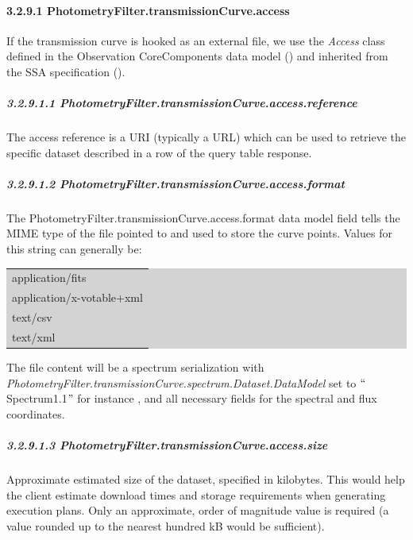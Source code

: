 \documentclass[11pt,a4paper]{ivoa}
\begin{document}
\paragraph{3.2.9.1 PhotometryFilter.transmissionCurve.access}
If the transmission curve is hooked as an external file, we use the \textit{Access} class defined in the Observation CoreComponents data model (\cite{louys2011ivoa}) and inherited from the SSA specification (\cite{2012ivoatody}).
\par

\subparagraph{3.2.9.1.1 PhotometryFilter.transmissionCurve.access.reference}
The access reference is a URI (typically a URL) which can be used to retrieve the specific dataset described in a row of the query table response. \par

\subparagraph{3.2.9.1.2 PhotometryFilter.transmissionCurve.access.format}
The PhotometryFilter.transmissionCurve.access.format data model field tells the MIME type of the file pointed to and used to store the curve points. Values for this string can generally be:\par

\bigskip
\par
\begingroup\setlength{\fboxsep}{0pt}
\colorbox{lightgray}{%
\begin{tabular}{|p{5.53in}|}
application/fits \\
application/x-votable+xml \\
text/csv \\
text/xml
\end{tabular}%
}\endgroup
\par
\bigskip



The file content will be a spectrum serialization with \textit{PhotometryFilter.transmissionCurve.spectrum.Dataset.DataModel }set to $``$Spectrum1.1$"$  for instance , and all necessary fields for the spectral and flux coordinates.
\par

\subparagraph{3.2.9.1.3 PhotometryFilter.transmissionCurve.access.size}
Approximate estimated size of the dataset, specified in kilobytes. This would help the client estimate download times and storage requirements when generating execution plans. Only an approximate, order of magnitude value is required (a value rounded up to the nearest hundred kB would be sufficient).\par
\end{document}
